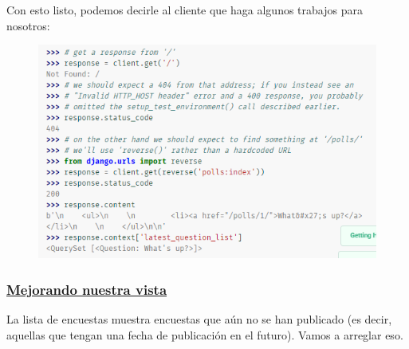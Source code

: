 \documentclass[10pt]{article}
\begin{document}
Con esto listo, podemos decirle al cliente que haga algunos trabajos para nosotros:

\begin{figure}[H]
\begin{center}
\includegraphics[scale=1]{figuras/3/35/357/img3.png}
\end{center}
\end{figure}

\subsubsection*{\underline{Mejorando nuestra vista}}
La lista de encuestas muestra encuestas que aún no se han publicado (es decir, aquellas que tengan una fecha de publicación en el futuro). Vamos a arreglar eso.
\end{document}
